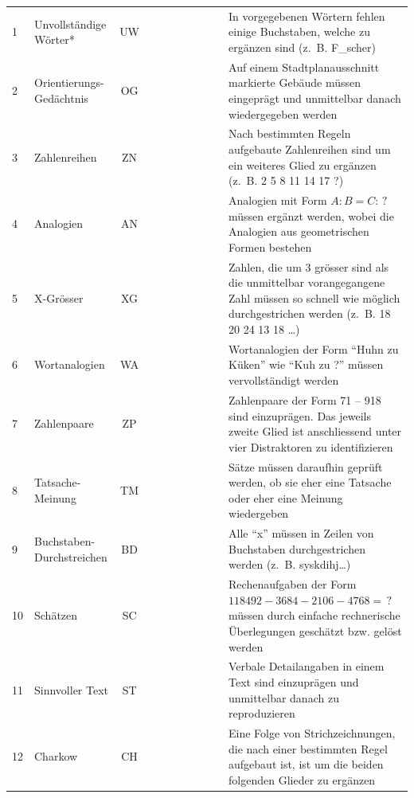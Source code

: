 \documentclass[11pt, twoside, a4paper]{book}		%
\begin{document}
\begin{table}
\begin{adjustbox}{width=\textwidth,totalheight=.9\textheight,keepaspectratio}
\begin{threeparttable}
\begin{tabular}{l l c c c c p{.0001cm} c c c p{20cm}}
				\hline
				1				&	Unvollständige Wörter*	&	UW			&&	\checkmark	&&&\checkmark&&& In vorgegebenen Wörtern fehlen einige Buchstaben, welche zu ergänzen sind (z.~B. F\_scher)	\\
				2				&	Orientierungs-Gedächtnis	&	OG		&&&	\checkmark	&&&&\checkmark& Auf einem Stadtplanausschnitt markierte Gebäude müssen eingeprägt und unmittelbar danach wiedergegeben werden\\
				3				&	Zahlenreihen			&	ZN			&	\checkmark	&&&&&\checkmark&& Nach bestimmten Regeln aufgebaute Zahlenreihen sind um ein weiteres Glied zu ergänzen (z.~B. 2 5 8 11 14 17 ?)\\
				4				&	Analogien				&	AN			&	\checkmark	&&&&&&\checkmark& Analogien mit Form $A:B=C:\,?$ müssen ergänzt werden, wobei die Analogien aus geometrischen Formen bestehen\\
				5				&	X-Grösser				&	XG			&&	\checkmark	&&&&\checkmark&& Zahlen, die um $3$ grösser sind als die unmittelbar vorangegangene Zahl müssen so schnell wie möglich durchgestrichen werden (z.~B. 18 20 24 \cancel{27} 13 18 \cancel{21} \ldots)\\
				6				&	Wortanalogien			&	WA			&	\checkmark	&&&&\checkmark&&& Wortanalogien der Form \enquote{Huhn zu Küken} wie \enquote{Kuh zu ?} müssen vervollständigt werden\\
				7				&	Zahlenpaare				&	ZP			&&&	\checkmark	&&&\checkmark&& Zahlenpaare der Form 71 -- 918 sind einzuprägen. Das jeweils zweite Glied ist anschliessend unter vier Distraktoren zu identifizieren\\
				8				&	Tatsache-Meinung		&	TM			&	\checkmark	&&&&\checkmark&&& Sätze müssen daraufhin geprüft werden, ob sie eher eine Tatsache oder eher eine Meinung wiedergeben\\
				9				&	Buchstaben-Durchstreichen&	BD			&&	\checkmark	&&&&&\checkmark& Alle \enquote{x} müssen in Zeilen von Buchstaben durchgestrichen werden (z.~B. sys\cancel{x}kdihj\cancel{x}\ldots)\\
				10				&	Schätzen				&	SC			&	\checkmark	&&&&&\checkmark&& Rechenaufgaben der Form $118492-3684-2106-4768=\,?$ müssen durch einfache rechnerische Überlegungen geschätzt bzw. gelöst werden\\
				11				&	Sinnvoller Text			&	ST			&&&	\checkmark	&&\checkmark&&& Verbale Detailangaben in einem Text sind einzuprägen und unmittelbar danach zu reproduzieren\\
				12				&	Charkow					&	CH			&	\checkmark	&&&&&&\checkmark& Eine Folge von Strichzeichnungen, die nach einer bestimmten Regel aufgebaut ist, ist um die beiden folgenden Glieder zu ergänzen\\

\end{tabular}
\end{threeparttable}
\end{adjustbox}
\end{table}
\end{document}
